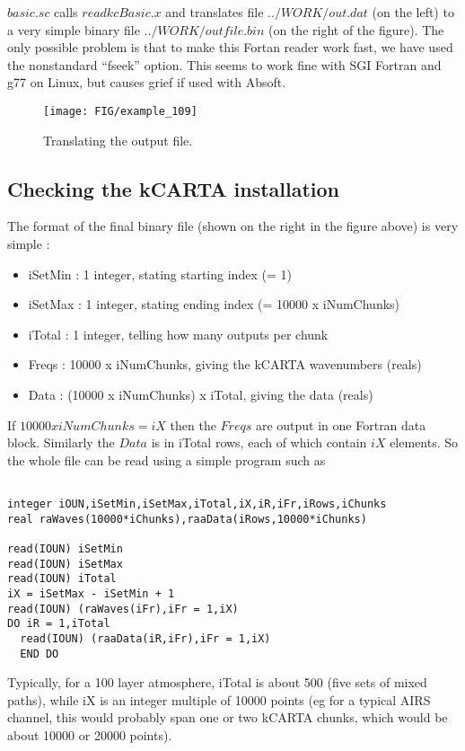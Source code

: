 \documentclass[12pt]{article}
\newcommand{\kc}{\textsf{kCARTA}\xspace}
\begin{document}
$basic.sc$ calls $readkcBasic.x$ and translates file $../WORK/out.dat$ 
(on the left) to a very simple binary file $../WORK/outfile.bin$ 
(on the right of the figure). The only possible problem is that to make this
Fortan reader work fast, we have used the nonstandard ``fseek'' option. 
This seems to work fine with SGI Fortran and g77 on Linux, but causes grief
if used with Absoft.

\begin{figure}
\texttt{[image: FIG/example\_109]}
\caption{Translating the output file.}
\label{translatingfiles}
\end{figure}

\subsection{Checking the \kc installation}

The format of the final binary file (shown on the right in the figure above)
is very simple :
\begin{itemize}
\item iSetMin : 1 integer, stating starting index (= 1)
\item iSetMax : 1 integer, stating ending index (= 10000 x iNumChunks)
\item iTotal  : 1 integer, telling how many outputs per chunk
\item Freqs   : 10000 x iNumChunks, giving the kCARTA wavenumbers (reals)
\item Data    : (10000 x iNumChunks) x iTotal, giving the data (reals)
\end{itemize}
If  $ 10000 x iNumChunks = iX$ then the $Freqs$ are output in one Fortran
data block. Similarly the $Data$ is in iTotal rows, each of which contain 
$iX$  elements. So the whole file can be read using a simple program such as

\begin{verbatim}

integer iOUN,iSetMin,iSetMax,iTotal,iX,iR,iFr,iRows,iChunks
real raWaves(10000*iChunks),raaData(iRows,10000*iChunks)

read(IOUN) iSetMin
read(IOUN) iSetMax
read(IOUN) iTotal
iX = iSetMax - iSetMin + 1
read(IOUN) (raWaves(iFr),iFr = 1,iX)
DO iR = 1,iTotal 
  read(IOUN) (raaData(iR,iFr),iFr = 1,iX) 
  END DO 
\end{verbatim}
Typically, for a 100 layer atmosphere, iTotal is about 500 (five sets of 
mixed paths), while iX is an integer multiple of 10000 points (eg for a 
typical AIRS channel, this would probably span one or two kCARTA chunks, which
would be about 10000 or 20000 points).
\end{document}
